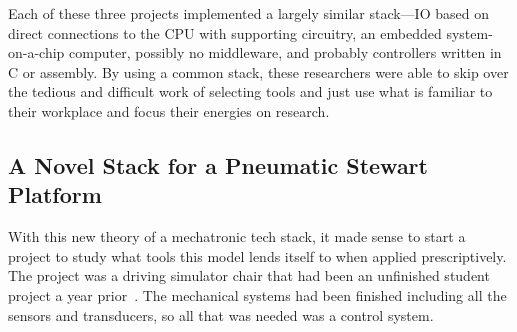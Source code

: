 \documentclass[english,12pt,a4paper,pdftex,eng,utf8]{aaltothesis}
\begin{document}
Each of these three projects implemented a largely similar stack---IO based on direct connections to the CPU with supporting circuitry, an embedded system-on-a-chip computer, possibly no middleware, and probably controllers written in C or assembly.  By using a common stack, these researchers were able to skip over the tedious and difficult work of selecting tools and just use what is familiar to their workplace and focus their energies on research.

\subsection{A Novel Stack for a Pneumatic Stewart Platform}

With this new theory of a mechatronic tech stack, it made sense to start a project to study what tools this model lends itself to when applied prescriptively.  The project was a driving simulator chair that had been an unfinished student project a year prior~\cite{Bjoerklund2023}.  The mechanical systems had been finished including all the sensors and transducers, so all that was needed was a control system.
\end{document}
